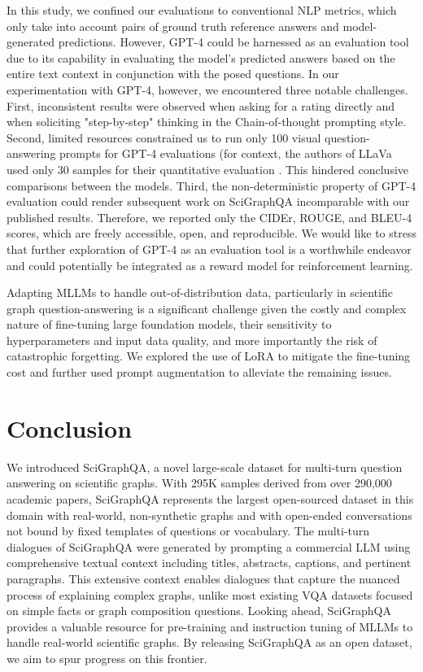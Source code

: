 \documentclass{article}
\begin{document}
In this study, we confined our evaluations to conventional NLP metrics, which only take into account pairs of ground truth reference answers and model-generated predictions. However, GPT-4 could be harnessed as an evaluation tool due to its capability in evaluating the model's predicted answers based on the entire text context in conjunction with the posed questions. In our experimentation with GPT-4, however, we encountered three notable challenges.
First, inconsistent results were observed when asking for a rating directly and when soliciting "step-by-step" thinking in the Chain-of-thought prompting style. Second, limited resources constrained us to run only 100 visual question-answering prompts for GPT-4 evaluations (for context, the authors of LLaVa used only 30 samples for their quantitative evaluation \cite{liu2023}. This hindered conclusive comparisons between the models.
Third, the non-deterministic property of GPT-4 evaluation could render subsequent work on SciGraphQA incomparable with our published results. Therefore, we reported only the CIDEr, ROUGE, and BLEU-4 scores, which are freely accessible, open, and reproducible. We would like to stress that further exploration of GPT-4 as an evaluation tool is a worthwhile endeavor and could potentially be integrated as a reward model for reinforcement learning.






Adapting MLLMs to handle out-of-distribution data, particularly in scientific graph question-answering is a significant challenge given the costly and complex nature of fine-tuning large foundation models, their sensitivity to hyperparameters and input data quality, and more importantly the risk of catastrophic forgetting. We explored the use of LoRA to mitigate the fine-tuning cost and further used prompt augmentation to alleviate the remaining issues.


\section{Conclusion}
We introduced SciGraphQA, a novel large-scale dataset for multi-turn question answering on scientific graphs. With 295K samples derived from over 290,000 academic papers, SciGraphQA represents the largest open-sourced dataset in this domain with real-world, non-synthetic graphs and with open-ended conversations not bound by fixed templates of questions or vocabulary. The multi-turn dialogues of SciGraphQA were generated by prompting a commercial LLM using comprehensive textual context including titles, abstracts, captions, and pertinent paragraphs. This extensive context enables dialogues that capture the nuanced process of explaining complex graphs, unlike most existing VQA datasets focused on simple facts or graph composition questions. Looking ahead, SciGraphQA provides a valuable resource for pre-training and instruction tuning of MLLMs to handle real-world scientific graphs. By releasing SciGraphQA as an open dataset, we aim to spur progress on this frontier.
\end{document}

